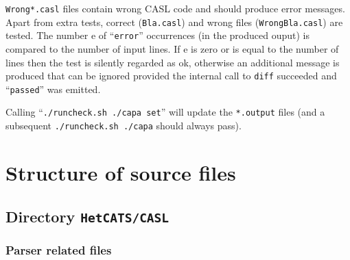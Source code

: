 \documentclass{article}
\begin{document}
\texttt{Wrong*.casl} files contain wrong CASL code and should produce
error messages. Apart from extra tests, correct (\texttt{Bla.casl})
and wrong files (\texttt{WrongBla.casl}) are tested. The number e of
``\texttt{error}'' occurrences (in the produced ouput) is compared to the
number of input lines. If e is zero or is equal to the number of lines
then the test is silently regarded as ok, otherwise an additional message
is produced that can be ignored provided the internal call to
\texttt{diff} succeeded and ``\texttt{passed}'' was emitted.

Calling ``\texttt{./runcheck.sh ./capa set}'' will update the \texttt{*.output} files (and a subsequent \texttt{./runcheck.sh ./capa} should always pass).

\section{Structure of source files}

\subsection{Directory \texttt{HetCATS/CASL}}

\subsubsection*{Parser related files}
\end{document}
